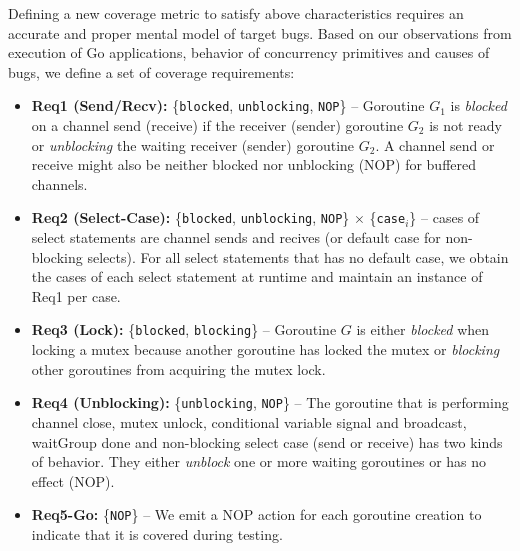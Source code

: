 Defining a new coverage metric to satisfy above characteristics requires an accurate and proper mental model of target bugs.
%
Based on our observations from execution of Go applications, behavior of concurrency primitives and causes of bugs, we define a set of coverage requirements:
%
\begin{itemize}
  \item \textbf{Req1 (Send/Recv):} \{\texttt{blocked}, \texttt{unblocking}, \texttt{NOP}\} -- Goroutine $G_1$ is \textit{blocked} on a channel send (receive) if the receiver (sender) goroutine $G_2$ is not ready or \textit{unblocking} the waiting receiver (sender) goroutine $G_2$. A channel send or receive might also be neither blocked nor unblocking (NOP) for buffered channels.
  \item \textbf{Req2 (Select-Case):} \{\texttt{blocked}, \texttt{unblocking}, \texttt{NOP}\} $\times$ \{\texttt{case}$_i$\} -- cases of select statements are channel sends and recives (or default case for non-blocking selects). For all select statements that has no default case, we obtain the cases of each select statement at runtime and maintain an instance of Req1 per case.
  \item \textbf{Req3 (Lock):} \{\texttt{blocked}, \texttt{blocking}\} -- Goroutine $G$ is either \textit{blocked} when locking a mutex because another goroutine has locked the mutex or \textit{blocking} other goroutines from acquiring the mutex lock.
  \item \textbf{Req4 (Unblocking):} \{\texttt{unblocking}, \texttt{NOP}\} -- The goroutine that is performing channel close, mutex unlock, conditional variable signal and broadcast, waitGroup done and non-blocking select case (send or receive) has two kinds of behavior. They either \textit{unblock} one or more waiting goroutines or has no effect (NOP).
  \item \textbf{Req5-Go:} \{\texttt{NOP}\} -- We emit a NOP action for each goroutine creation to indicate that it is covered during testing.
\end{itemize}


